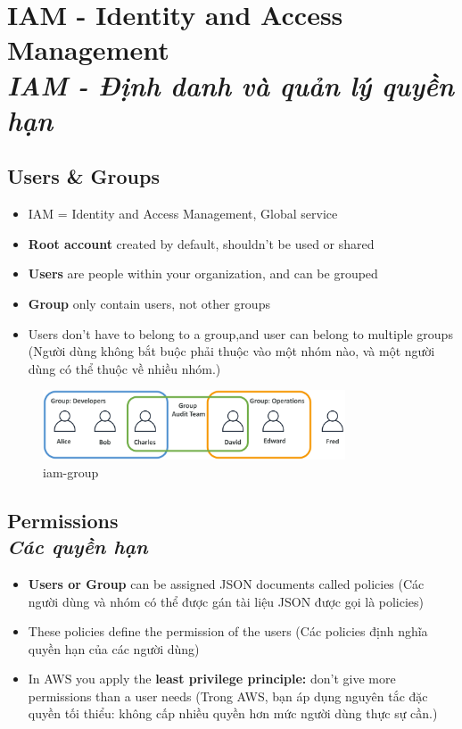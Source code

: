 \section[IAM - Identity and Access Management]{\textbf{IAM - Identity and Access Management} \\ \textit{IAM - Định danh và quản lý quyền hạn}}

\subsection[Users \& Groups]{Users \& Groups}

\begin{itemize}
	\item IAM = Identity and Access Management, Global service 
	\item \textbf{Root account} created by default, shouldn't be used or shared  
	\item \textbf{Users} are people within your organization, and can be grouped
	\item \textbf{Group} only contain users, not other groups
	\item Users don't have to belong to a group,and user can belong to multiple groups (Người dùng không bắt buộc phải thuộc vào một nhóm nào, và một người dùng có thể thuộc về nhiều nhóm.)
\end{itemize}

\begin{figure}[htbp]
	\centering
	\includegraphics[width=0.8\textwidth]{images/iam-group}
	\caption{iam-group}
	\label{fig:iam-group}
\end{figure}

\subsection[Permissions]{Permissions \\ \textit{Các quyền hạn}}

\begin{itemize}
	\item \textbf{Users or Group} can be assigned JSON documents called policies (Các người dùng và nhóm có thể được gán tài liệu JSON được gọi là policies)
	\item These policies define the permission of the users (Các policies định nghĩa quyền hạn của các người dùng)
	\item In AWS you apply the \textbf{least privilege principle:} don't give more permissions than a user needs (Trong AWS, bạn áp dụng nguyên tắc đặc quyền tối thiểu: không cấp nhiều quyền hơn mức người dùng thực sự cần.)
\end{itemize}

